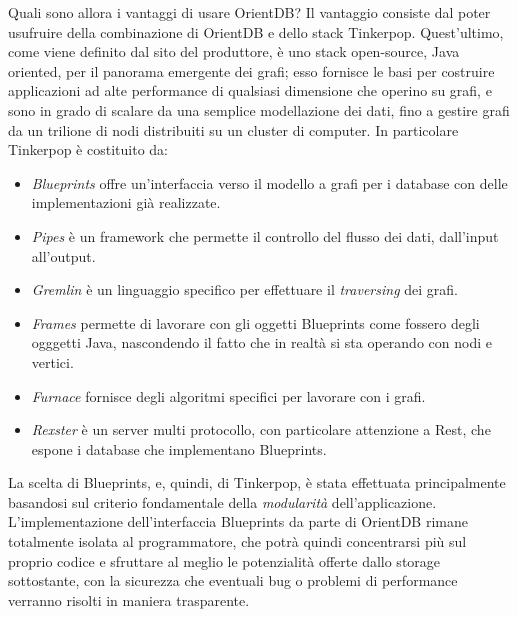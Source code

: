 Quali sono allora i vantaggi di usare OrientDB? Il vantaggio consiste dal poter usufruire della combinazione di OrientDB e dello stack Tinkerpop. Quest'ultimo, come viene definito dal sito del produttore, è uno stack open-source, Java oriented, per il panorama emergente dei grafi; esso fornisce le basi per costruire applicazioni ad alte performance di qualsiasi dimensione che operino su grafi, e sono in grado di scalare da una semplice modellazione dei dati, fino a gestire grafi da un trilione di nodi distribuiti su un cluster di computer. In particolare Tinkerpop è costituito da:
\begin{itemize}
\item \emph{Blueprints} offre un'interfaccia verso il modello a grafi per i database con delle implementazioni già realizzate.
\item \emph{Pipes} è un framework che permette il controllo del flusso dei dati, dall'input all'output.
\item \emph{Gremlin} è un linguaggio specifico per effettuare il \emph{traversing} dei grafi.
\item \emph {Frames} permette di lavorare con gli oggetti Blueprints come fossero degli ogggetti Java, nascondendo il fatto che in realtà si sta operando con nodi e vertici.
\item \emph{Furnace} fornisce degli algoritmi specifici per lavorare con i grafi.
\item \emph{Rexster} è un server multi protocollo, con particolare attenzione a Rest, che espone i database che implementano Blueprints.
\end{itemize}
La scelta di Blueprints, e, quindi, di Tinkerpop, è stata effettuata principalmente basandosi sul criterio fondamentale della \emph{modularità} dell'applicazione. L'implementazione dell'interfaccia Blueprints da parte di OrientDB rimane totalmente isolata al programmatore, che potrà quindi concentrarsi più sul proprio codice e sfruttare al meglio le potenzialità offerte dallo storage sottostante, con la sicurezza che eventuali bug o problemi di performance verranno risolti in maniera trasparente.

